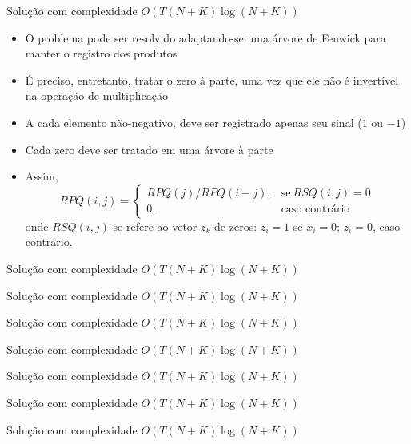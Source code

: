 \begin{frame}[fragile]{Solução com complexidade $O(T(N + K)\log(N + K))$}

    \begin{itemize}
        \item O problema pode ser resolvido adaptando-se uma árvore de Fenwick para 
            manter o registro dos produtos

        \item É preciso, entretanto, tratar o zero à parte, uma vez que ele não é invertível
            na operação de multiplicação

        \item A cada elemento não-negativo, deve ser registrado apenas seu sinal ($1$ ou $-1$)

        \item Cada zero deve ser tratado em uma árvore à parte

        \item Assim,
        \[
            RPQ(i, j) = \left\lbrace \begin{array}{ll} RPQ(j) / RPQ(i - j), & \mbox{se}\ RSQ(i, j) = 0\\
            0,& \mbox{caso contrário}\end{array} \right.
        \]
        onde $RSQ(i, j)$ se refere ao vetor $z_k$ de zeros: $z_i = 1$ se $x_i = 0$; $z_i = 0$,
        caso contrário.
 
   \end{itemize}

\end{frame}

\begin{frame}[fragile]{Solução com complexidade $O(T(N + K)\log(N + K))$}
\end{frame}

\begin{frame}[fragile]{Solução com complexidade $O(T(N + K)\log(N + K))$}
\end{frame}

\begin{frame}[fragile]{Solução com complexidade $O(T(N + K)\log(N + K))$}
\end{frame}

\begin{frame}[fragile]{Solução com complexidade $O(T(N + K)\log(N + K))$}
\end{frame}

\begin{frame}[fragile]{Solução com complexidade $O(T(N + K)\log(N + K))$}
\end{frame}

\begin{frame}[fragile]{Solução com complexidade $O(T(N + K)\log(N + K))$}
\end{frame}

\begin{frame}[fragile]{Solução com complexidade $O(T(N + K)\log(N + K))$}
\end{frame}

